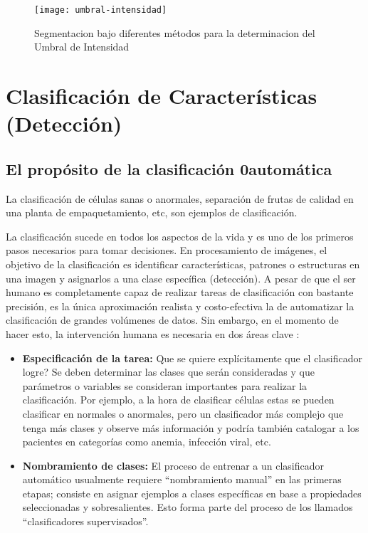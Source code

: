     \begin{figure}[H]
        \centering
        \texttt{[image: umbral-intensidad]}
        \caption{Segmentacion bajo diferentes métodos para la determinacion del Umbral de Intensidad  \protect\cite{Solomon2011-xz}}
        \label{fig:umbral-intensidad}
    \end{figure}
    


\section{Clasificación de Características (Detección)}
\subsection{El propósito de la clasificación 0automática}
La clasificación de células sanas o anormales, separación de frutas de calidad en una planta de empaquetamiento, etc, son ejemplos de clasificación. 

La clasificación sucede en todos los aspectos de la vida y es uno de los primeros pasos necesarios para tomar decisiones. En procesamiento de imágenes, el objetivo de la clasificación es identificar características, patrones o estructuras en una imagen y asignarlos a una clase específica (detección). A pesar de que el ser humano es completamente capaz de realizar tareas de clasificación con bastante precisión, es la única aproximación realista y costo-efectiva la de automatizar la clasificación de grandes volúmenes de datos. Sin embargo, en el momento de hacer esto, la intervención humana es necesaria en dos áreas clave \cite{Solomon2011-xz}: 

\begin{itemize}
\item \textbf{Especificación de la tarea: }Que se quiere explícitamente que el clasificador logre? Se deben determinar las clases que serán consideradas y que parámetros o variables se consideran importantes para realizar la clasificación. Por ejemplo, a la hora de clasificar células estas se pueden clasificar en normales o anormales, pero un clasificador más complejo que tenga más clases y observe más información y podría también catalogar a los pacientes en categorías como anemia, infección viral, etc.
\item \textbf{Nombramiento de clases: }El proceso de entrenar a un clasificador automático usualmente requiere “nombramiento manual” en las primeras etapas; consiste en asignar ejemplos a clases específicas en base a propiedades seleccionadas y sobresalientes. Esto forma parte del proceso de los llamados “clasificadores supervisados”.
\end{itemize}

